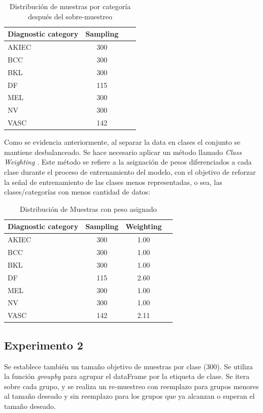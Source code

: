 \begin{table}[ht]
   \centering
   \begin{tabular}{lccc}
   \hline
   Diagnostic category & Sampling  \\ \hline
   AKIEC & 300 \\
   BCC & 300 \\
   BKL & 300 \\
   DF & 115 \\
   MEL & 300 \\
   NV & 300 \\
   VASC & 142 \\ \hline
   \end{tabular}
   \caption{Distribución de muestras por categoría después del sobre-muestreo}
   \label{tab:sampling_distribution}
   \end{table}


Como se evidencia anteriormente, al separar la data en clases el conjunto se mantiene desbalanceado. Se hace necesario aplicar un método llamado \textit{Class Weighting} . Este método se refiere a la asignación de pesos diferenciados a cada clase durante el proceso de entrenamiento del modelo, con el objetivo de reforzar la señal de entrenamiento de las clases menos representadas, o sea, las clases/categorías con menos cantidad de datos:

\begin{table}[ht]
   \centering
   \begin{tabular}{lccc}
   \hline
   Diagnostic category & Sampling  & Weighting\\ \hline
   AKIEC & 300 & 1.00\\
   BCC & 300 & 1.00\\
   BKL & 300 & 1.00\\
   DF & 115 & 2.60\\
   MEL & 300 & 1.00\\
   NV & 300 & 1.00\\
   VASC & 142 & 2.11\\ \hline
   \end{tabular}
   \caption{Distribución de Muestras con peso asignado}
   \label{tab:weighting_distribution}
   \end{table}

\subsection{Experimento 2}

Se establece también un tamaño objetivo de muestras por clase (300). Se utiliza la función \textit{groupby} para agrupar el dataFrame por la etiqueta de clase. Se itera sobre cada grupo, y se realiza un re-muestreo con reemplazo para grupos menores al tamaño deseado y sin reemplazo para los grupos que ya alcanzan o superan el tamaño deseado.

